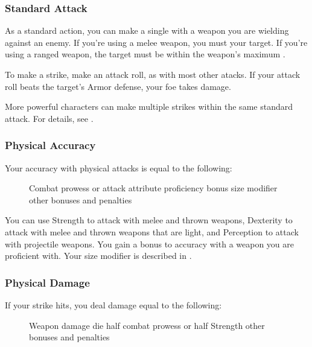         \subsubsection{Standard Attack}\label{Standard Attack}
            As a standard action, you can make a single  with a weapon you are wielding against an enemy.
            If you're using a melee weapon, you must  your target.
            If you're using a ranged weapon, the target must be within the weapon's maximum .

            To make a strike, make an attack roll, as with most other atacks.
            If your attack roll beats the target's Armor defense, your foe takes damage.

            More powerful characters can make multiple strikes within the same standard attack.
            For details, see .

        \subsubsection{Physical Accuracy}\label{Physical Accuracy}
            Your accuracy with physical attacks is equal to the following:

            \begin{figure}[h]
                \centering Combat prowess or attack attribute \add proficiency bonus \add size modifier \add other bonuses and penalties
            \end{figure}

             You can use Strength to attack with melee and thrown weapons, Dexterity to attack with melee and thrown weapons that are light, and Perception to attack with projectile weapons.
             You gain a  bonus to accuracy with a weapon you are proficient with.
             Your size modifier is described in .

        \subsubsection{Physical Damage}\label{Physical Damage}
            If your strike hits, you deal damage equal to the following:
            \begin{figure}[h]
                \centering Weapon damage die \add half combat prowess or half Strength \add other bonuses and penalties
            \end{figure}

